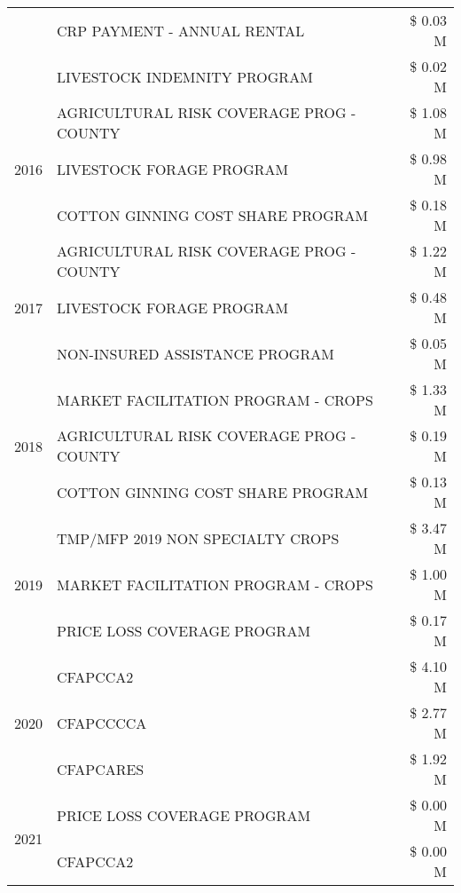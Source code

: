 \begin{tabular}{llr}
 & CRP PAYMENT - ANNUAL RENTAL & \$ 0.03 M \\
 & LIVESTOCK INDEMNITY PROGRAM & \$ 0.02 M \\
\cline{1-3}
\multirow[t]{3}{*}{2016} & AGRICULTURAL RISK COVERAGE PROG - COUNTY & \$ 1.08 M \\
 & LIVESTOCK FORAGE PROGRAM & \$ 0.98 M \\
 & COTTON GINNING COST SHARE PROGRAM & \$ 0.18 M \\
\cline{1-3}
\multirow[t]{3}{*}{2017} & AGRICULTURAL RISK COVERAGE PROG - COUNTY & \$ 1.22 M \\
 & LIVESTOCK FORAGE PROGRAM & \$ 0.48 M \\
 & NON-INSURED ASSISTANCE PROGRAM & \$ 0.05 M \\
\cline{1-3}
\multirow[t]{3}{*}{2018} & MARKET FACILITATION PROGRAM - CROPS & \$ 1.33 M \\
 & AGRICULTURAL RISK COVERAGE PROG - COUNTY & \$ 0.19 M \\
 & COTTON GINNING COST SHARE PROGRAM & \$ 0.13 M \\
\cline{1-3}
\multirow[t]{3}{*}{2019} & TMP/MFP 2019 NON SPECIALTY CROPS & \$ 3.47 M \\
 & MARKET FACILITATION PROGRAM - CROPS & \$ 1.00 M \\
 & PRICE LOSS COVERAGE PROGRAM & \$ 0.17 M \\
\cline{1-3}
\multirow[t]{3}{*}{2020} & CFAPCCA2 & \$ 4.10 M \\
 & CFAPCCCCA & \$ 2.77 M \\
 & CFAPCARES & \$ 1.92 M \\
\cline{1-3}
\multirow[t]{2}{*}{2021} & PRICE LOSS COVERAGE PROGRAM & \$ 0.00 M \\
 & CFAPCCA2 & \$ 0.00 M \\
\cline{1-3}
\bottomrule
\end{tabular}
